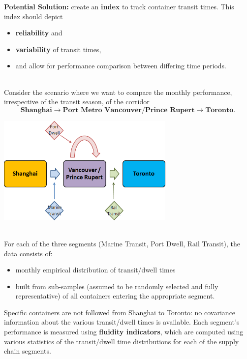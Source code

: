 \documentclass[20pt,landscape,footrule,headrule]{foils}
\newcommand{\newl}{\newline\newline}
\begin{document}
\textbf{Potential Solution:} create an \textbf{index} to track container transit times. \newl This index should depict 
\begin{itemize}
\item \textbf{reliability} and
\item \textbf{variability} of transit times, 
\item and allow for performance comparison between differing time periods.
\end{itemize} 
\newpage\ \\ \noindent Consider the scenario where we want to compare the  monthly performance, irrespective of the transit season, of the corridor $$\textbf{Shanghai} \to \textbf{Port Metro Vancouver/Prince Rupert} \to \textbf{Toronto}.$$  
\begin{center}
\includegraphics[width=0.65\textwidth]{Images/mmsc_EN.png}
\end{center}
\newpage\ \\ \noindent 
For each of the three segments (Marine Transit, Port Dwell, Rail Transit), the data consists of:
\begin{itemize}
\item monthly empirical distribution of transit/dwell times
\item built from sub-samples (assumed to be randomly selected and fully representative) of all containers entering the appropriate segment.
\end{itemize}
Specific containers are not followed from Shanghai to Toronto: no covariance information about the various transit/dwell times is available. \newl Each segment's performance is measured using \textbf{fluidity indicators}, which are computed using various statistics of the transit/dwell time distributions for each of the supply chain segments. 
\end{document}
